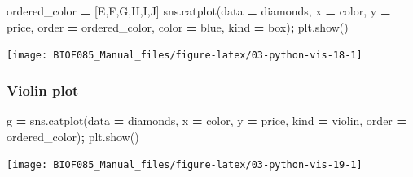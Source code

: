 \documentclass[
  letterpaper,
]{scrbook}
\newenvironment{Shaded}{\begin{snugshade}}{\end{snugshade}}
\newcommand{\NormalTok}[1]{#1}
\newcommand{\OperatorTok}[1]{\textcolor[rgb]{0.81,0.36,0.00}{\textbf{#1}}}
\newcommand{\StringTok}[1]{\textcolor[rgb]{0.31,0.60,0.02}{#1}}
\begin{document}
\begin{Shaded}
\begin{Highlighting}[]
\NormalTok{ordered\_color }\OperatorTok{=}\NormalTok{ [}\StringTok{\textquotesingle{}E\textquotesingle{}}\NormalTok{,}\StringTok{\textquotesingle{}F\textquotesingle{}}\NormalTok{,}\StringTok{\textquotesingle{}G\textquotesingle{}}\NormalTok{,}\StringTok{\textquotesingle{}H\textquotesingle{}}\NormalTok{,}\StringTok{\textquotesingle{}I\textquotesingle{}}\NormalTok{,}\StringTok{\textquotesingle{}J\textquotesingle{}}\NormalTok{]}
\NormalTok{sns.catplot(data }\OperatorTok{=}\NormalTok{ diamonds, x }\OperatorTok{=} \StringTok{\textquotesingle{}color\textquotesingle{}}\NormalTok{, y }\OperatorTok{=} \StringTok{\textquotesingle{}price\textquotesingle{}}\NormalTok{, }
\NormalTok{            order }\OperatorTok{=}\NormalTok{ ordered\_color, color }\OperatorTok{=} \StringTok{\textquotesingle{}blue\textquotesingle{}}\NormalTok{, kind }\OperatorTok{=} \StringTok{\textquotesingle{}box\textquotesingle{}}\NormalTok{)}\OperatorTok{;}
\NormalTok{plt.show()}
\end{Highlighting}
\end{Shaded}

\begin{center}\texttt{[image: BIOF085\_Manual\_files/figure-latex/03-python-vis-18-1]} \end{center}

\hypertarget{violin-plot}{%
\subsubsection{Violin plot}\label{violin-plot}}

\begin{Shaded}
\begin{Highlighting}[]
\NormalTok{g }\OperatorTok{=}\NormalTok{ sns.catplot(data }\OperatorTok{=}\NormalTok{ diamonds, x }\OperatorTok{=} \StringTok{\textquotesingle{}color\textquotesingle{}}\NormalTok{, y }\OperatorTok{=} \StringTok{\textquotesingle{}price\textquotesingle{}}\NormalTok{, }
\NormalTok{                kind }\OperatorTok{=} \StringTok{\textquotesingle{}violin\textquotesingle{}}\NormalTok{, order }\OperatorTok{=}\NormalTok{ ordered\_color)}\OperatorTok{;}
\NormalTok{plt.show()}
\end{Highlighting}
\end{Shaded}

\begin{center}\texttt{[image: BIOF085\_Manual\_files/figure-latex/03-python-vis-19-1]} \end{center}
\end{document}
